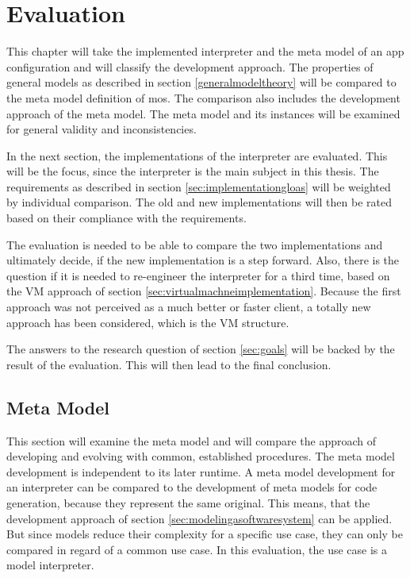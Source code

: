 
\chapter{Evaluation}

This chapter will take the implemented interpreter and the meta model of an app configuration and will classify the development approach.
The properties of general models as described in section \ref{generalmodeltheory} will be compared to the meta model definition of \ac{mos}.
The comparison also includes the development approach of the meta model.
The meta model and its instances will be examined for general validity and inconsistencies.

In the next section, the implementations of the interpreter are evaluated.
This will be the focus, since the interpreter is the main subject in this thesis.
The requirements as described in section \ref{sec:implementationgloas} will be weighted by individual comparison.
The old and new implementations will then be rated based on their compliance with the requirements.

The evaluation is needed to be able to compare the two implementations and ultimately decide, if the new implementation is a step forward.
Also, there is the question if it is needed to re-engineer the interpreter for a third time, based on the \ac{VM} approach of section \ref{sec:virtualmachneimplementation}.
Because the first approach was not perceived as a much better or faster client, a totally new approach has been considered, which is the \ac{VM} structure.

The answers to the research question of section \ref{sec:goals} will be backed by the result of the evaluation.
This will then lead to the final conclusion.


\section {Meta Model}

This section will examine the meta model and will compare the approach of developing and evolving with common, established procedures.
The meta model development is independent to its later runtime.
A meta model development for an interpreter can be compared to the development of meta models for code generation, because they represent the same original.
This means, that the development approach of section \ref{sec:modelingasoftwaresystem} can be applied.
But since models reduce their complexity for a specific use case, they can only be compared in regard of a common use case.
In this evaluation, the use case is a model interpreter.

